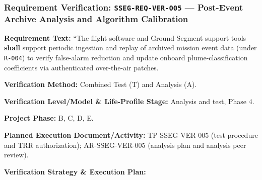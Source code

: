 \subsubsection{Requirement Verification: \texttt{SSEG-REQ-VER-005} --- Post-Event Archive Analysis and Algorithm Calibration}
\label{ver:SSEG-REQ-VER-005}
\textbf{Requirement Text:} ``The  flight software and Ground Segment support tools \textbf{shall} support periodic ingestion and replay of archived mission event data (under \texttt{R-004}) to verify false-alarm reduction and update onboard plume-classification coefficients via authenticated over-the-air patches.
\par\textbf{Verification Method:} Combined Test (T) and Analysis (A).
\par\textbf{Verification Level/Model \& Life-Profile Stage:} Analysis and test, Phase 4.
\par\textbf{Project Phase:} B, C, D, E.
\par\textbf{Planned Execution Document/Activity:} TP-SSEG-VER-005 (test procedure and TRR authorization); AR-SSEG-VER-005 (analysis plan and analysis peer review).
\par\textbf{Verification Strategy \& Execution Plan:}

